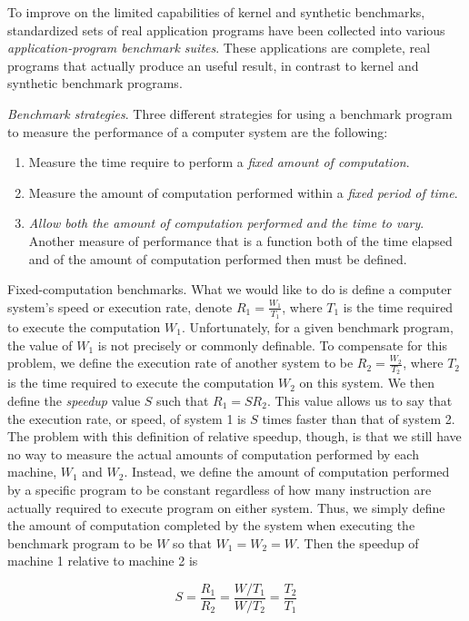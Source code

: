 \documentclass[openany, a4paper]{book}
\theoremstyle{break}
\theoremstyle{example}
\theoremstyle{note}
\theoremstyle{break}
\theoremstyle{exercise}
\begin{document}
To improve on the limited capabilities of kernel and synthetic benchmarks,
standardized sets of real application programs have been collected into
various \emph{application-program benchmark suites}. These applications are
complete, real programs that actually produce an useful result, in contrast
to kernel and synthetic benchmark programs.

\emph{Benchmark strategies}. Three different strategies for using a benchmark
program to measure the performance of a computer system are the following:

\begin{enumerate}
\item Measure the time require to perform a \emph{fixed amount of computation}.
\item Measure the amount of computation performed within a \emph{fixed period of
time}.
\item \emph{Allow both the amount of computation performed and the time to
vary}. Another measure of performance that is a function both of the time
elapsed and of the amount of computation performed then must be defined.
\end{enumerate}


Fixed-computation benchmarks. What we would like to do is define a computer
system's speed or execution rate, denote \(R_1 = \frac{W_1}{T_1}\), where
\(T_1\) is the time required to execute the computation
\(W_1\). Unfortunately, for a given benchmark program, the value of \(W_1\)
is not precisely or commonly definable. To compensate for this problem, we
define the execution rate of another system to be \(R_2 = \frac{W_2}{T_2}\),
where \(T_2\) is the time required to execute the computation \(W_2\) on
this system. We then define the \emph{speedup} value \(S\) such that \(R_1 =
    SR_2\). This value allows us to say that the execution rate, or speed, of
system 1 is \(S\) times faster than that of system 2.
The problem with this definition of relative speedup, though, is that we
still have no way to measure the actual amounts of computation performed by
each machine, \(W_1\) and \(W_2\). Instead, we define the amount of
computation performed by a specific program to be constant regardless of how
many instruction are actually required to execute program on either
system. Thus, we simply define the amount of computation completed by the
system when executing the benchmark program to be \(W\) so  that \(W_1 =
    W_2 = W\). Then the speedup of machine 1 relative to machine 2 is

\begin{equation}
  S = \frac{R_1}{R_2} = \frac{W/T_1}{W/T_2} = \frac{T_2}{T_1}
\end{equation}
\end{document}

